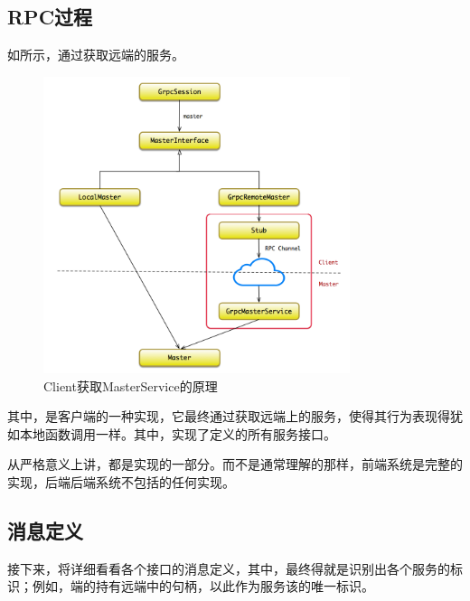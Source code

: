 \begin{content}
\begin{content}
\subsection{RPC过程}

如所示，通过获取远端的服务。

\begin{figure}[H]
\centering
\includegraphics[width=0.8\textwidth]{figures/dist-client-master-interaction.png}
\caption{Client获取MasterService的原理}
 \label{fig:dist-client-master-interaction}
\end{figure}

其中，是客户端的一种实现，它最终通过获取远端上的服务，使得其行为表现得犹如本地函数调用一样。其中，实现了定义的所有服务接口。

\begin{remark}
从严格意义上讲，都是实现的一部分。而不是通常理解的那样，前端系统是完整的实现，后端后端系统不包括的任何实现。
\end{remark}

\subsection{消息定义}

接下来，将详细看看各个接口的消息定义，其中，最终得就是识别出各个服务的标识；例如，端的持有远端中的句柄，以此作为服务该的唯一标识。


\end{content}
\end{content}
